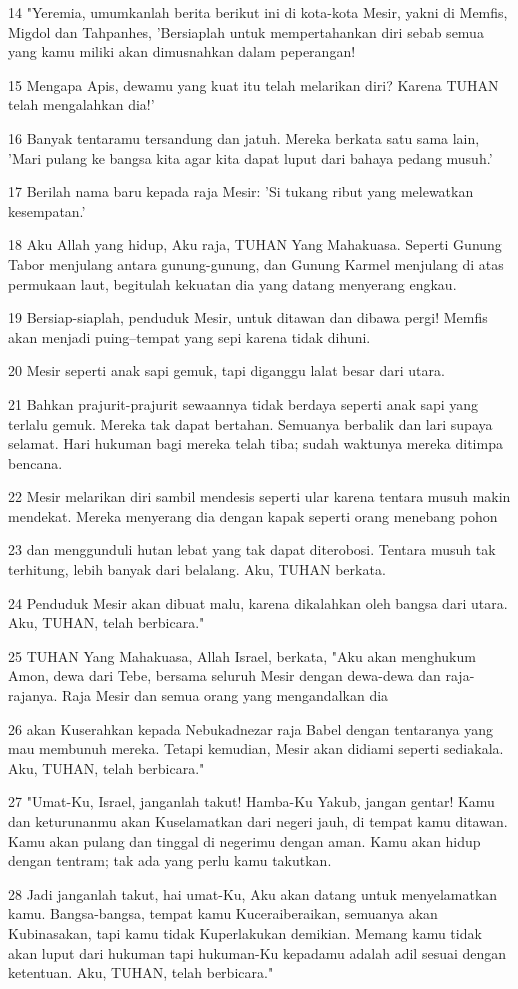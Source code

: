 \par 14 "Yeremia, umumkanlah berita berikut ini di kota-kota Mesir, yakni di Memfis, Migdol dan Tahpanhes, 'Bersiaplah untuk mempertahankan diri sebab semua yang kamu miliki akan dimusnahkan dalam peperangan!
\par 15 Mengapa Apis, dewamu yang kuat itu telah melarikan diri? Karena TUHAN telah mengalahkan dia!'
\par 16 Banyak tentaramu tersandung dan jatuh. Mereka berkata satu sama lain, 'Mari pulang ke bangsa kita agar kita dapat luput dari bahaya pedang musuh.'
\par 17 Berilah nama baru kepada raja Mesir: 'Si tukang ribut yang melewatkan kesempatan.'
\par 18 Aku Allah yang hidup, Aku raja, TUHAN Yang Mahakuasa. Seperti Gunung Tabor menjulang antara gunung-gunung, dan Gunung Karmel menjulang di atas permukaan laut, begitulah kekuatan dia yang datang menyerang engkau.
\par 19 Bersiap-siaplah, penduduk Mesir, untuk ditawan dan dibawa pergi! Memfis akan menjadi puing--tempat yang sepi karena tidak dihuni.
\par 20 Mesir seperti anak sapi gemuk, tapi diganggu lalat besar dari utara.
\par 21 Bahkan prajurit-prajurit sewaannya tidak berdaya seperti anak sapi yang terlalu gemuk. Mereka tak dapat bertahan. Semuanya berbalik dan lari supaya selamat. Hari hukuman bagi mereka telah tiba; sudah waktunya mereka ditimpa bencana.
\par 22 Mesir melarikan diri sambil mendesis seperti ular karena tentara musuh makin mendekat. Mereka menyerang dia dengan kapak seperti orang menebang pohon
\par 23 dan menggunduli hutan lebat yang tak dapat diterobosi. Tentara musuh tak terhitung, lebih banyak dari belalang. Aku, TUHAN berkata.
\par 24 Penduduk Mesir akan dibuat malu, karena dikalahkan oleh bangsa dari utara. Aku, TUHAN, telah berbicara."
\par 25 TUHAN Yang Mahakuasa, Allah Israel, berkata, "Aku akan menghukum Amon, dewa dari Tebe, bersama seluruh Mesir dengan dewa-dewa dan raja-rajanya. Raja Mesir dan semua orang yang mengandalkan dia
\par 26 akan Kuserahkan kepada Nebukadnezar raja Babel dengan tentaranya yang mau membunuh mereka. Tetapi kemudian, Mesir akan didiami seperti sediakala. Aku, TUHAN, telah berbicara."
\par 27 "Umat-Ku, Israel, janganlah takut! Hamba-Ku Yakub, jangan gentar! Kamu dan keturunanmu akan Kuselamatkan dari negeri jauh, di tempat kamu ditawan. Kamu akan pulang dan tinggal di negerimu dengan aman. Kamu akan hidup dengan tentram; tak ada yang perlu kamu takutkan.
\par 28 Jadi janganlah takut, hai umat-Ku, Aku akan datang untuk menyelamatkan kamu. Bangsa-bangsa, tempat kamu Kuceraiberaikan, semuanya akan Kubinasakan, tapi kamu tidak Kuperlakukan demikian. Memang kamu tidak akan luput dari hukuman tapi hukuman-Ku kepadamu adalah adil sesuai dengan ketentuan. Aku, TUHAN, telah berbicara."

